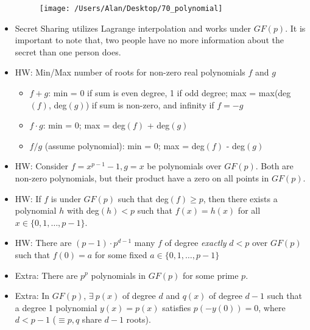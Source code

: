 \documentclass{article}
\begin{document}
\begin{itemize}
\begin{figure} [h!]
\begin{center}
	\texttt{[image: /Users/Alan/Desktop/70\_polynomial]}
	\label{fig}
\end{center}
\end{figure}
	\item Secret Sharing utilizes Lagrange interpolation and works under $GF(p)$. It is important to note that, two people have no more information about the secret than one person does.
	\item HW: Min/Max number of roots for non-zero real polynomials $f$ and $g$
	\begin{itemize}
		\item $f+g$: {\color{red} min} = 0 if sum is even degree, 1 if odd degree; {\color{red} max} = max(deg$(f)$, deg$(g)$) if sum is non-zero, and infinity if $f=-g$
		\item $f\cdot g$: {\color{red} min} = 0; {\color{red} max} = deg$(f)$ + deg$(g)$
		\item $f/g$ (assume polynomial): {\color{red} min} = 0; {\color{red} max} = deg$(f)$ - deg$(g)$
	\end{itemize}
	\item HW: Consider $f = x^{p-1}-1, g=x$ be polynomials over $GF(p)$. Both are non-zero polynomials, but their product have a zero on all points in $GF(p)$.
	\item HW: If $f$ is under $GF(p)$ such that deg$(f)\geq p$, then there exists a polynomial $h$ with deg$(h) < p$ such that $f(x) = h(x)$ for all $x \in \{0, 1, \dots, p-1\}$.
	\item HW: There are $(p-1)\cdot p^{d-1}$ many $f$ of degree \textit{exactly} $d < p$ over $GF(p)$ such that $f(0) = a$ for some fixed $a \in\{0,1,\dots,p-1\}$
	\item Extra: There are $p^p$ polynomials in $GF(p)$ for some prime $p$.
	\item Extra: In $GF(p)$, $\exists\ p(x)$ of degree $d$ and $q(x)$ of degree $d-1$ such that a degree 1 polynomial $y(x) = p(x)$ satisfies $p(-y(0)) = 0$, where $d < p-1$ ($\equiv p,q$ share $d-1$ roots).
\end{itemize}
\end{document}
